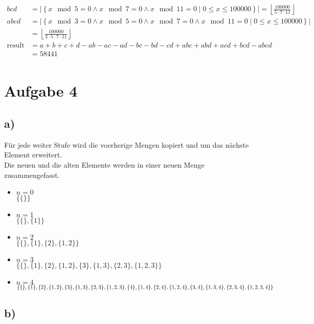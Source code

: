 \documentclass[a4paper]{scrartcl}
\begin{document}
\begin{align*}
    bcd &= \left|\left\{ x \mod 5 = 0 \land x \mod 7 = 0 \land x \mod 11 = 0 \mid 0 \leq x \leq 100000 \right\}\right| = \left\lfloor\frac{100000}{5 \cdot 7 \cdot 11}\right\rfloor \\
    abcd &= \left|\left\{ x \mod 3 = 0 \land x \mod 5 = 0 \land x \mod 7 = 0 \land x \mod 11 = 0 \mid 0 \leq x \leq 100000 \right\}\right| \\&= \left\lfloor\frac{100000}{3 \cdot 5 \cdot 7 \cdot 11}\right\rfloor \\
    \text{result} &= a + b + c + d - ab - ac - ad - bc - bd - cd + abc + abd + acd + bcd - abcd \\&= 58441 \\
\end{align*}

\newpage
\section*{Aufgabe 4}
\subsection*{a)}
Für jede weiter Stufe wird die voerherige Mengen kopiert und um das nächste Element erweitert.\\
Die neuen und die alten Elemente werden in einer neuen Menge zusammengefasst.\\
\begin{itemize}
    \item $n = 0$ \\
    $ \{ \{\} \} $
    \item $n = 1$ \\
    $ \{ \{\}, \{1\} \} $
    \item $n = 2$ \\
    $ \{ \{\}, \{1\}, \{2\}, \{1, 2\} \} $
    \item $n = 3$ \\
    $ \{ \{\}, \{1\}, \{2\}, \{1, 2\}, \{3\}, \{1, 3\}, \{2, 3\}, \{1, 2, 3\} \} $
    \item $n = 4$ \\
    $ \{ \{\}, \{1\}, \{2\}, \{1, 2\}, \{3\}, \{1, 3\}, \{2, 3\}, \{1, 2, 3\}, \\ \{4\}, \{1, 4\}, \{2, 4\}, \{1, 2, 4\}, \{3, 4\}, \{1, 3, 4\}, \{2, 3, 4\}, \{1, 2, 3, 4\} \} $
\end{itemize}

\subsection*{b)}
\end{document}
